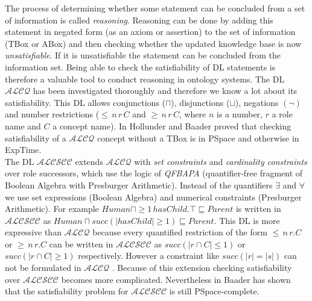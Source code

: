 \documentclass{book}
\theoremstyle{break}
\theoremstyle{definition}
\begin{document}
The process of determining whether some statement can be concluded from a set of information is called \textit{reasoning}. Reasoning can be done by adding this statement in negated form (as an axiom or assertion) to the set of information (TBox or ABox) and then checking whether the updated knowledge base is now \textit{unsatisfiable}. If it is unsatisfiable the statement can be concluded from the information set. Being able to check the satisfiability of DL statements is therefore a valuable tool to conduct reasoning in ontology systems. The DL $\mathcal{ALCQ}$ \cite{1}\cite{6} has been investigated thoroughly and therefore we know a lot about its satisfiability. This DL allows conjunctions ($\sqcap$), disjunctions ($\sqcup$), negations $(\neg)$ and number restrictions ($\leq\,n\,r\, C$ and $\geq \, n\, r\, C$, where $n$ is a number, $r$ a role name and $C$ a concept name). In \cite{1} Hollunder and Baader proved that checking satisfiability of a $\mathcal{ALCQ}$ concept without a TBox is in PSpace and otherwise in ExpTime.\\
The DL $\mathcal{ALCSCC}$ \cite{4} extends $\mathcal{ALCQ}$ with \textit{set constraints} and \textit{cardinality constraints} over role successors, which use the logic of \textit{QFBAPA} (quantifier-free fragment of Boolean Algebra with Presburger Arithmetic)\cite{KuncakRinard}. Instead of the quantifiers $\exists$ and $\forall$ we use set expressions (Boolean Algebra) and numerical constraints (Presburger Arithmetic). For example $Human \sqcap \geq 1\,hasChild.\top\sqsubseteq Parent$ is written in $\mathcal{ALCSCC}$ as $Human\sqcap succ(|hasChild|\geq 1)\sqsubseteq Parent$. This DL is more expressive than $\mathcal{ALCQ}$ because every quantified restriction of the form $\leq\,n\,r.C$ or $\geq \, n\, r.C$ can be written in $\mathcal{ALCSCC}$ as $succ(|r\cap C|\leq 1)$ or $succ(|r\cap C|\geq 1)$ respectively. However a constraint like $succ(|r|=|s|)$ can not be formulated in $\mathcal{ALCQ}$ \cite{4}. Because of this extension checking satisfiability over $\mathcal{ALCSCC}$ becomes more complicated. Nevertheless in \cite{4} Baader has shown that the satisfiability problem for $\mathcal{ALCSCC}$ is still PSpace-complete.\\
\end{document}

